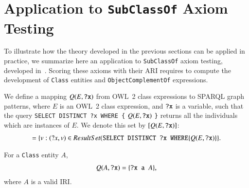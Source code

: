 \documentclass[review]{elsarticle}
\theoremstyle{definition}
\begin{document}
\section{Application to \texttt{SubClassOf} Axiom Testing}
\label{OWL2SPARQL} 

To illustrate how the theory developed in the previous sections can be
applied in practice, we summarize here an application to \texttt{SubClassOf}
axiom testing, developed in~\cite{TettamanziFaronZuckerGandon2014ekaw,%
TettamanziFaronZuckerGandon2015kcap}.
Scoring these axioms with their ARI requires to compute the development
of \texttt{Class} entities and \texttt{ObjectComplementOf} expressions. 
 
We define a mapping $Q(E, \mbox{\tt ?x})$ from OWL~2 class expressions to SPARQL graph patterns,
where $E$ is an OWL~2 class expression, and $\mbox{\tt ?x}$ is a variable,
such that the query
\texttt{SELECT DISTINCT ?x WHERE \{} $Q(E, \mbox{\tt ?x})$ \texttt{\}}
returns all the individuals which are instances of $E$. We denote this set by
$[Q(E, \mbox{\tt ?x})]$:
\begin{equation}
[Q(E, \mbox{\tt ?x})] = \{ v : (?x, v) \in ResultSet(\mbox{\tt SELECT DISTINCT ?x WHERE} \{ Q(E, \mbox{\tt ?x}) \} \}.
\end{equation} 

For a \texttt{Class} entity $A$, 
\begin{equation}
Q(A, \mbox{\tt ?x}) = \{\mbox{\tt ?x a }A \},
\end{equation}
where $A$ is a valid IRI.
\end{document}

